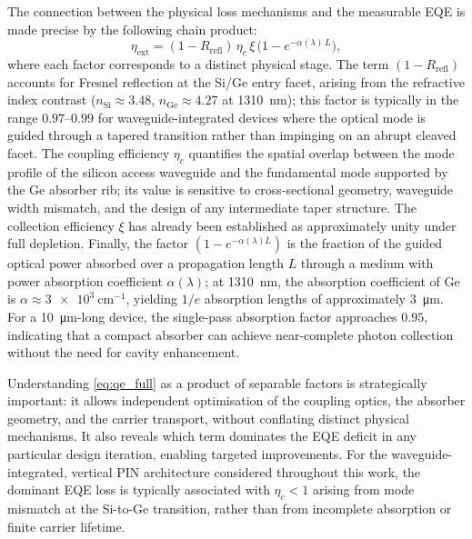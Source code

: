 The connection between the physical loss mechanisms and the measurable EQE is
made precise by the following chain product:
\begin{equation}
    \eta_{\mathrm{ext}}
    = (1 - R_{\mathrm{refl}})\,\eta_c\,\xi\,
      \bigl(1 - e^{-\alpha(\lambda)\,L}\bigr),
    \label{eq:qe_full}
\end{equation}
where each factor corresponds to a distinct physical stage. The term
$(1-R_{\mathrm{refl}})$ accounts for Fresnel reflection at the Si/Ge entry
facet, arising from the refractive index contrast ($n_{\mathrm{Si}}\approx3.48$,
$n_{\mathrm{Ge}}\approx4.27$ at \SI{1310}{\nano\metre}); this factor is
typically in the range $0.97$--$0.99$ for waveguide-integrated devices where the
optical mode is guided through a tapered transition rather than impinging on an
abrupt cleaved facet. The coupling efficiency $\eta_c$ quantifies the spatial
overlap between the mode profile of the silicon access waveguide and the
fundamental mode supported by the Ge absorber rib; its value is sensitive to
cross-sectional geometry, waveguide width mismatch, and the design of any
intermediate taper structure. The collection efficiency $\xi$ has already been
established as approximately unity under full depletion. Finally, the factor
$(1 - e^{-\alpha(\lambda) L})$ is the fraction of the guided optical power
absorbed over a propagation length $L$ through a medium with power absorption
coefficient $\alpha(\lambda)$; at \SI{1310}{\nano\metre}, the absorption
coefficient of Ge is $\alpha \approx \SI{3e3}{\centi\metre^{-1}}$, yielding
$1/e$ absorption lengths of approximately \SI{3}{\micro\metre}. For a
\SI{10}{\micro\metre}-long device, the single-pass absorption factor approaches
$0.95$, indicating that a compact absorber can achieve near-complete photon
collection without the need for cavity enhancement.

Understanding \cref{eq:qe_full} as a product of separable factors is
strategically important: it allows independent optimisation of the coupling
optics, the absorber geometry, and the carrier transport, without conflating
distinct physical mechanisms. It also reveals which term dominates the EQE
deficit in any particular design iteration, enabling targeted improvements.
For the waveguide-integrated, vertical PIN architecture considered throughout
this work, the dominant EQE loss is typically associated with $\eta_c < 1$
arising from mode mismatch at the Si-to-Ge transition, rather than from
incomplete absorption or finite carrier lifetime.

